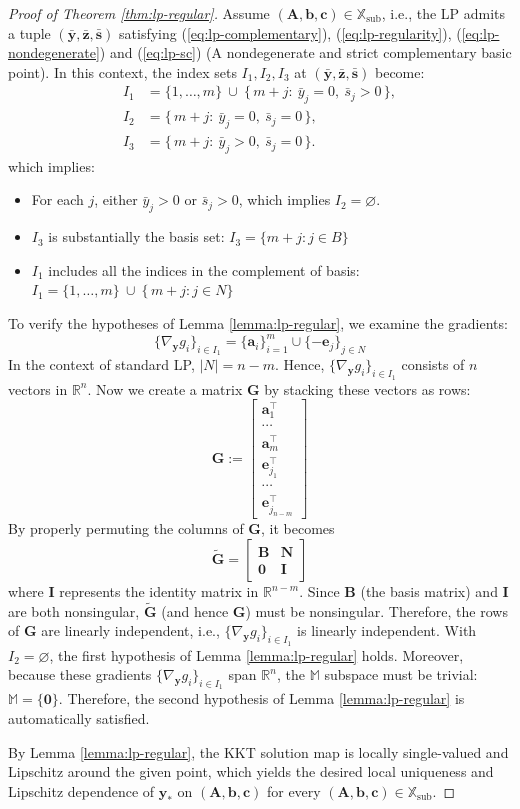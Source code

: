 \documentclass{amsart} %
\def\eqref#1{equation~\ref{#1}}
\def\vzero{{\bm{0}}}
\def\va{{\bm{a}}}
\def\vb{{\bm{b}}}
\def\vc{{\bm{c}}}
\def\ve{{\bm{e}}}
\def\vs{{\bm{s}}}
\def\vy{{\bm{y}}}
\def\vz{{\bm{z}}}
\def\mA{{\bm{A}}}
\def\mB{{\bm{B}}}
\def\mG{{\bm{G}}}
\def\mI{{\bm{I}}}
\def\mN{{\bm{N}}}
\def\sM{{\mathbb{M}}}
\def\sR{{\mathbb{R}}}
\def\sX{{\mathbb{X}}}
\theoremstyle{definition}
\theoremstyle{remark}
\renewcommand{\eqref}[1]{\textup{(\ref{#1})}}
\begin{document}
\begin{proof}[Proof of Theorem \ref{thm:lp-regular}]
Assume \((\mA,\vb,\vc)\in\sX_{\mathrm{sub}}\), i.e., the LP admits a tuple $(\bar\vy,\bar\vz,\bar\vs)$ satisfying \eqref{eq:lp-complementary}, \eqref{eq:lp-regularity}, \eqref{eq:lp-nondegenerate} and \eqref{eq:lp-sc} (A nondegenerate and strict complementary basic point). In this context, the index sets \(I_1,I_2,I_3\) at \((\bar\vy,\bar\vz,\bar\vs)\) become:
\[
\begin{aligned}
I_1 &= \{1,\ldots,m\}\ \cup\ \{\,m+j:\ \bar y_j=0,\ \bar s_j>0\,\},\\
I_2 &= \{\,m+j:\ \bar y_j=0,\ \bar s_j=0\,\},\\
I_3 &= \{\,m+j:\ \bar y_j>0,\ \bar s_j=0\,\}.
\end{aligned}
\]
which implies:
\begin{itemize}
\item For each \(j\), either \(\bar y_j>0\) or \(\bar s_j>0\), which implies \(I_2=\varnothing\).
\item $I_3$ is substantially the basis set: $I_3 = \{m + j:j \in B\}$
\item $I_1$ includes all the indices in the complement of basis: $I_1 = \{1,\ldots,m\}\ \cup\ \{\,m+j: j \in N\}$
\end{itemize}
To verify the hypotheses of Lemma \ref{lemma:lp-regular}, we examine the gradients:
\[\{\nabla_\vy g_i\}_{i\in I_1}=\{\va_i\}_{i=1}^m \cup \{-\ve_j\}_{j\in N} \]
In the context of standard LP, $|N|=n-m$. Hence, \(\{\nabla_\vy g_i\}_{i\in I_1}\) consists of $n$ vectors in $\sR^n$. Now we create a matrix $\mG$ by stacking these vectors as rows:
\[\mG:=\begin{bmatrix}
\va^\top_1 \\
\cdots \\
\va^\top_m \\
\ve^\top_{j_1} \\
\cdots \\
\ve^\top_{j_{n-m}}
\end{bmatrix}\]
By properly permuting the columns of $\mG$, it becomes
\[
\tilde{\mG} = \begin{bmatrix}
\mB & \mN \\
\vzero & \mI
\end{bmatrix}
\]
where $\mI$ represents the identity matrix in $\sR^{n-m}$. Since $\mB$ (the basis matrix) and $\mI$ are both nonsingular, $\tilde{\mG}$ (and hence $\mG$) must be nonsingular. Therefore, the rows of $\mG$ are linearly independent, i.e., \(\{\nabla_\vy g_i\}_{i\in I_1}\) is linearly independent. With \(I_2=\varnothing\), the first hypothesis of Lemma \ref{lemma:lp-regular} holds. Moreover, because these gradients \(\{\nabla_\vy g_i\}_{i\in I_1}\) span $\sR^n$, the $\sM$ subspace must be trivial: $\sM=\{\vzero\}$. Therefore, the second hypothesis of Lemma \ref{lemma:lp-regular} is automatically satisfied. 

By Lemma \ref{lemma:lp-regular}, the KKT solution map is locally single-valued and Lipschitz around the given point, which yields the desired local uniqueness and Lipschitz dependence of \(\vy_\ast\) on \((\mA,\vb,\vc)\) for every \((\mA,\vb,\vc)\in\sX_{\mathrm{sub}}\).
\end{proof}
\end{document}
